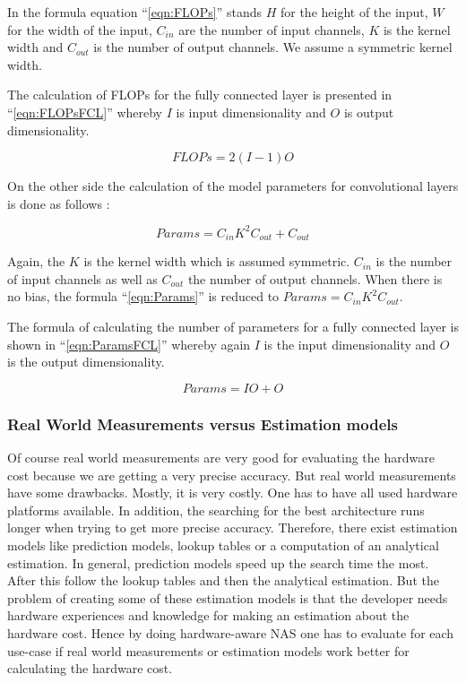\documentclass[conference]{IEEEtran}
\begin{document}
In the formula equation ``\eqref{eqn:FLOPs}'' stands $H$ for the height of the input, $W$ for the width of the input, $C_{in}$ are the number of input channels, $K$ is the kernel width and $C_{out}$ is the number of output channels. We assume a symmetric kernel width. 

The calculation of FLOPs for the fully connected layer is presented in ``\eqref{eqn:FLOPsFCL}'' whereby $I$ is input dimensionality and $O$ is output dimensionality. 

\begin{equation}
\label{eqn:FLOPsFCL}
FLOPs = 2(I-1)O
\end{equation} 

On the other side the calculation of the model parameters for convolutional layers is done as follows \cite{bib6}:

\begin{equation}
\label{eqn:Params}
Params = C_{in}K^{2}C_{out}+C_{out}
\end{equation} 

Again, the $K$ is the kernel width which is assumed symmetric. $C_{in}$ is the number of input channels as well as $C_{out}$ the number of output channels. When there is no bias, the formula ``\eqref{eqn:Params}'' is reduced to $Params = C_{in}K^{2}C_{out}$. 

The formula of calculating the number of parameters for a fully connected layer is shown in ``\eqref{eqn:ParamsFCL}'' whereby again $I$ is the input dimensionality and $O$ is the output dimensionality. 

\begin{equation}
\label{eqn:ParamsFCL}
Params = IO+O
\end{equation}  


\subsubsection{Real World Measurements versus Estimation models}

Of course real world measurements are very good for evaluating the hardware cost because we are getting a very precise accuracy. But real world measurements have some drawbacks. Mostly, it is very costly. One has to have all used hardware platforms available. In addition, the searching for the best architecture runs longer when trying to get more precise accuracy. Therefore, there exist estimation models like prediction models, lookup tables or a computation of an analytical estimation. In general, prediction models speed up the search time the most. After this follow the lookup tables and then the analytical estimation. But the problem of creating some of these estimation models is that the developer needs hardware experiences and knowledge for making an estimation about the hardware cost. Hence by doing hardware-aware NAS one has to evaluate for each use-case if real world measurements or estimation models work better for calculating the hardware cost. 
\end{document}
